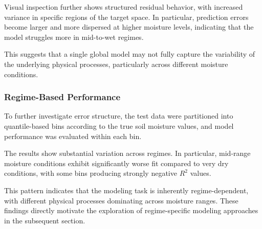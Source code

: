 Visual inspection further shows structured residual behavior, with increased variance in specific regions of the target space. In particular, prediction errors become larger and more dispersed at higher moisture levels, indicating that the model struggles more in mid-to-wet regimes.

This suggests that a single global model may not fully capture the variability of the underlying physical processes, particularly across different moisture conditions.

\subsubsection*{Regime-Based Performance}
To further investigate error structure, the test data were partitioned into quantile-based bins according to the true soil moisture values, and model performance was evaluated within each bin.

The results show substantial variation across regimes. In particular, mid-range moisture conditions exhibit significantly worse fit compared to very dry conditions, with some bins producing strongly negative $R^2$ values.

This pattern indicates that the modeling task is inherently regime-dependent, with different physical processes dominating across moisture ranges. These findings directly motivate the exploration of regime-specific modeling approaches in the subsequent section.
